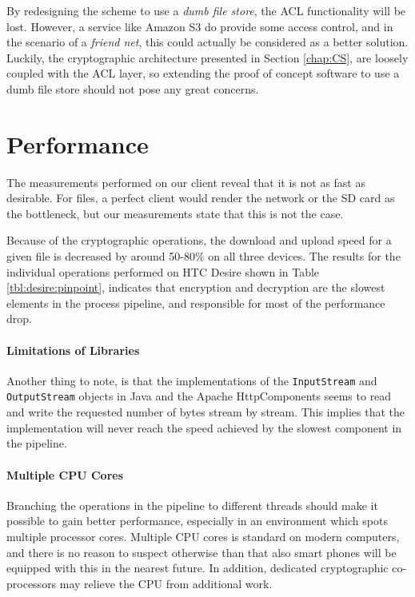 \documentclass[pdftex,english,10pt,b5paper,twoside]{book}
\begin{document}
By redesigning the scheme to use a \emph{dumb file store}, the \ac{ACL}
functionality will be lost. However, a service like Amazon S3 do provide some
access control, and in the scenario of a \emph{friend net}, this could actually
be considered as a better solution. Luckily, the cryptographic architecture
presented in Section \ref{chap:CS}, are loosely coupled with the \ac{ACL}
layer, so extending the proof of concept software to use a dumb file store
should not pose any great concerns.

\section{Performance}

The measurements performed on our client reveal that it is not as fast as
desirable. For files, a perfect client would render the network or the SD card
as the bottleneck, but our measurements state that this is not the case. 

Because of the cryptographic operations, the download and upload speed for a
given file is decreased by around 50-80\% on all three devices. The results for
the individual operations performed on HTC Desire shown in Table
\ref{tbl:desire:pinpoint}, indicates that encryption and decryption are the
slowest elements in the process pipeline, and responsible for most of the
performance drop. 

\paragraph{Limitations of Libraries} Another thing to note, is that the
implementations of the \texttt{InputStream} and \texttt{OutputStream} objects
in Java and the Apache HttpComponents seems to read and write the requested
number of bytes stream by stream. This implies that the implementation will
never reach the speed achieved by the slowest component in the pipeline.

\paragraph{Multiple CPU Cores} Branching the operations in the pipeline to
different threads should make it possible to gain better performance,
especially in an environment which spots multiple processor cores. Multiple
\ac{CPU} cores is standard on modern computers, and there is no reason to
suspect otherwise than that also smart phones will be equipped with this in the
nearest future. In addition, dedicated cryptographic co-processors may
relieve the \ac{CPU} from additional work.
\end{document}
